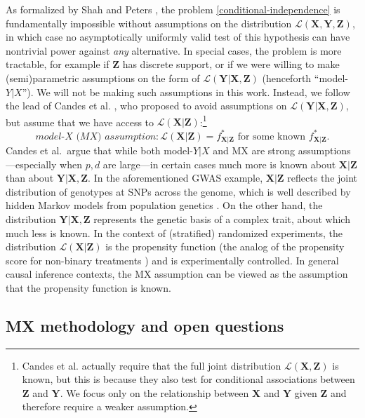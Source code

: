 \documentclass[12pt]{article}
\theoremstyle{definition}
\theoremstyle{remark}
\newcommand{\prx}{\bm X}
\newcommand{\prz}{\bm Z}
\newcommand{\pry}{{\bm Y}}
\begin{document}
As formalized by Shah and Peters \cite{Shah2018}, the problem \eqref{conditional-independence} is fundamentally impossible without assumptions on the distribution $\mathcal L(\prx,\pry, \prz)$, in which case no asymptotically uniformly valid test of this hypothesis can have nontrivial power against \emph{any} alternative. In special cases, the problem is more tractable, for example if $\prz$ has discrete support, or if we were willing to make (semi)parametric assumptions on the form of $\mathcal L(\pry|\prx, \prz)$ (henceforth ``model-$Y|X$''). We will not be making such assumptions in this work.
Instead, we follow the lead of Candes et al. \cite{CetL16}, who proposed to avoid assumptions on $\mathcal L(\pry|\prx, \prz)$, but assume that we have access to $\mathcal L(\prx|\prz)$:\footnote{Candes et al. actually require that the full joint distribution $\mathcal L(\prx,\prz)$ is known, but this is because they also test for conditional associations between $\prz$ and $\pry$. We focus only on the relationship between $\prx$ and $\pry$ given $\prz$ and therefore require a weaker assumption.} 
\begin{equation} \label{eq:modelX}
\textit{model-X (MX) assumption}: \mathcal L(\prx| \prz)=  f^*_{\prx|\prz} \text{ for some known } f^*_{\prx|\prz}. 
\end{equation}
Candes et al.\ argue that while both model-$Y|X$ and MX are strong assumptions---especially when $p,d$ are large---in certain cases much more is known about $\prx | \prz$ than about $\pry|\prx, \prz$. In the aforementioned GWAS example, $\prx|\prz$ reflects the joint distribution of genotypes at SNPs across the genome, which is well described by hidden Markov models from population genetics \cite{SetC17}. On the other hand, the distribution $\pry|\prx,\prz$ represents the genetic basis of a complex trait, about which much less is known. In the context of (stratified) randomized experiments, the distribution $\mathcal L(\prx | \prz)$ is the propensity function \cite{Imai2004} (the analog of the propensity score for non-binary treatments \cite{Rosenbaum1983}) and is experimentally controlled. In general causal inference contexts, the MX assumption can be viewed as the assumption that the propensity function is known. 

\subsection{MX methodology and open questions}
\end{document}
